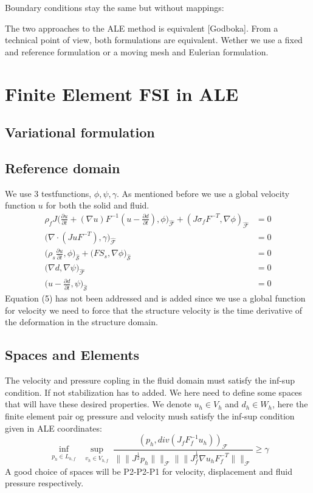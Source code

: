 Boundary conditions stay the same but without mappings:

The two approaches to the ALE method is equivalent [Godboka]. 
From a technical point of view, both formulations are equivalent. Wether we use a fixed and reference formulation or a moving mesh and Eulerian formulation. 
\section*{Finite Element FSI in ALE}
\subsection*{Variational formulation}
\subsection*{Reference domain}
We use 3 testfunctions, $\phi, \psi, \gamma$. As mentioned before we use a global velocity function $u$ for both the solid and fluid.
\begin{align}
\rho_f J \big( \frac{\partial u}{\partial t} + (\nabla u)F^{-1}(u-\frac{\partial d}{\partial t}) , \phi\big)_{\mathcal{\hat{F}}} + (J\sigma_f F^{-T},\nabla \phi )_{\mathcal{\hat{F}}} &= 0  \\
 \big( \nabla \cdot (J u F^{-T}),\gamma \big)_{\mathcal{\hat{F}}} &= 0 \\
\big(\rho_s \frac{\partial u}{\partial t},\phi \big)_{\mathcal{\hat{S}}} + \big(F S_s, \nabla \phi \big)_{\mathcal{\hat{S}}} &=0 \\
 \big( \nabla d , \nabla \psi \big)_{\mathcal{\hat{F}}} &= 0 \\
 \big( u- \frac{\partial d}{\partial t} ,\psi \big)_{\mathcal{\hat{S}}} &= 0 
\end{align}
Equation (5) has not been addressed and is added since we use a global function for velocity we need to force that the structure velocity is the time derivative of the deformation in the structure domain. 

\subsection*{Spaces and Elements}
The velocity and pressure copling in the fluid domain must satisfy the inf-sup condition. If not stabilization has to added. We here need to define some spaces that will have these desired properties.
We denote $u_h \in V_h$ and $ d_h \in W_h $, here the finite element pair og pressure and velocity mush satisfy the inf-sup condition given in ALE coordinates:
$$   \inf_{\substack{p_h \in L_{h,f}}}  \sup_{\substack{v_h \in V_{h,f}}} \frac{ (p_h, div(J_f F_f^{-1} u_h))_{\mathcal{F}} }{ \|\|J^{\frac{1}{2}} p_h  \|\|_{\mathcal{F}} \|\|  J^{\frac{1}{2}}_{f} \nabla u_h F_f^{-T} \|\|_{\mathcal{F}}  } \geq \gamma     $$
A good choice of spaces will be P2-P2-P1 for velocity, displacement and fluid pressure respectively. 

